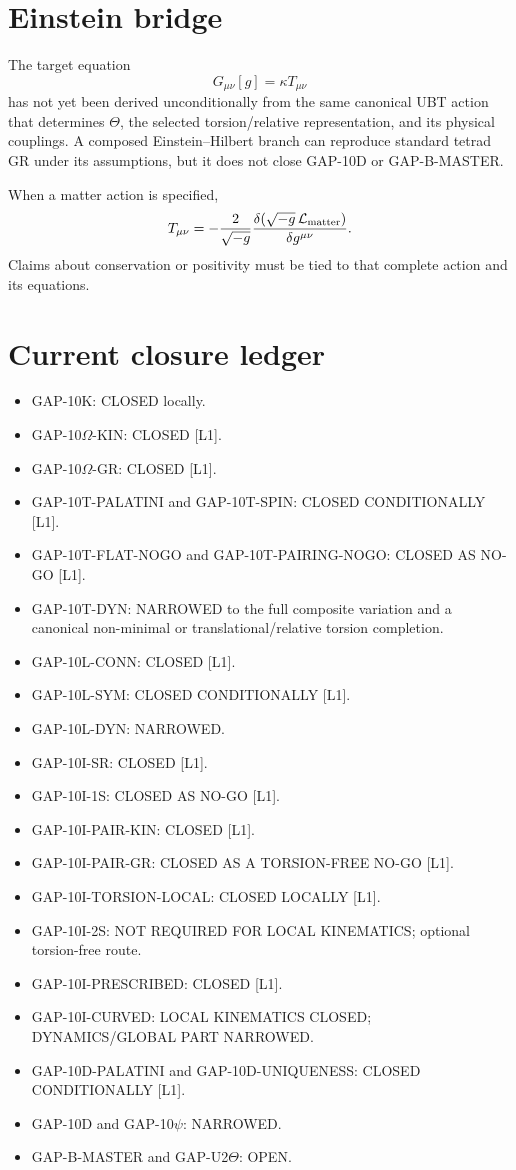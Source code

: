 \documentclass[11pt,a4paper]{article}
\begin{document}
\section{Einstein bridge}

The target equation
\begin{equation}\label{eq:einstein}
 G_{\mu\nu}[g]=\kappa T_{\mu\nu}
\end{equation}
has not yet been derived unconditionally from the same canonical UBT action
that determines $\Theta$, the selected torsion/relative representation, and its physical couplings.  A composed
Einstein--Hilbert branch can reproduce standard tetrad GR under its assumptions,
but it does not close GAP-10D or GAP-B-MASTER.

When a matter action is specified,
\[
 T_{\mu\nu}=-\frac{2}{\sqrt{-g}}
 \frac{\delta(\sqrt{-g}\,\mathcal L_{\rm matter})}{\delta g^{\mu\nu}}.
\]
Claims about conservation or positivity must be tied to that complete action
and its equations.

\section{Current closure ledger}

\begin{itemize}
 \item GAP-10K: CLOSED locally.
 \item GAP-10$\Omega$-KIN: CLOSED [L1].
 \item GAP-10$\Omega$-GR: CLOSED [L1].
 \item GAP-10T-PALATINI and GAP-10T-SPIN: CLOSED CONDITIONALLY [L1].
 \item GAP-10T-FLAT-NOGO and GAP-10T-PAIRING-NOGO: CLOSED AS NO-GO [L1].
 \item GAP-10T-DYN: NARROWED to the full composite variation and a canonical
       non-minimal or translational/relative torsion completion.
 \item GAP-10L-CONN: CLOSED [L1].
 \item GAP-10L-SYM: CLOSED CONDITIONALLY [L1].
 \item GAP-10L-DYN: NARROWED.
 \item GAP-10I-SR: CLOSED [L1].
 \item GAP-10I-1S: CLOSED AS NO-GO [L1].
 \item GAP-10I-PAIR-KIN: CLOSED [L1].
 \item GAP-10I-PAIR-GR: CLOSED AS A TORSION-FREE NO-GO [L1].
 \item GAP-10I-TORSION-LOCAL: CLOSED LOCALLY [L1].
 \item GAP-10I-2S: NOT REQUIRED FOR LOCAL KINEMATICS; optional torsion-free route.
 \item GAP-10I-PRESCRIBED: CLOSED [L1].
 \item GAP-10I-CURVED: LOCAL KINEMATICS CLOSED; DYNAMICS/GLOBAL PART NARROWED.
 \item GAP-10D-PALATINI and GAP-10D-UNIQUENESS: CLOSED CONDITIONALLY [L1].
 \item GAP-10D and GAP-10$\psi$: NARROWED.
 \item GAP-B-MASTER and GAP-U2$\Theta$: OPEN.
\end{itemize}
\end{document}
